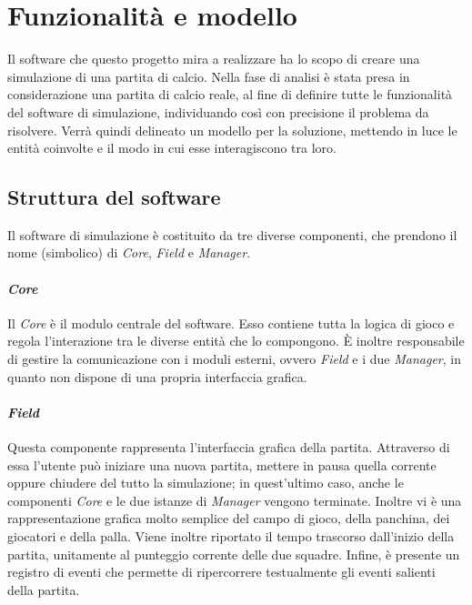 
\section{Funzionalità e modello}
\label{sec:analisi}

Il software che questo progetto mira a realizzare ha lo scopo di creare una simulazione di una partita di calcio. Nella fase di analisi è stata presa in considerazione una partita di calcio reale, al fine di definire tutte le funzionalità del software di simulazione, individuando così con precisione il problema da risolvere. Verrà quindi delineato un modello per la soluzione, mettendo in luce le entità coinvolte e il modo in cui esse interagiscono tra loro.

\subsection{Struttura del software}
\label{sec:struttura_del_software}

Il software di simulazione è costituito da tre diverse componenti, che prendono il nome (simbolico) di \textit{Core}, \textit{Field} e \textit{Manager}.

\paragraph{\textit{Core}} \label{sec:struttura_core} Il \textit{Core} è il modulo centrale del software. Esso contiene tutta la logica di gioco e regola l'interazione tra le diverse entità che lo compongono. È inoltre responsabile di gestire la comunicazione con i moduli esterni, ovvero \textit{Field} e i due \textit{Manager}, in quanto non dispone di una propria interfaccia grafica.

\paragraph{\textit{Field}} \label{sec:struttura_field} Questa componente rappresenta l'interfaccia grafica della partita. Attraverso di essa l'utente può iniziare una nuova partita, mettere in pausa quella corrente oppure chiudere del tutto la simulazione; in quest'ultimo caso, anche le componenti \textit{Core} e le due istanze di \textit{Manager} vengono terminate. Inoltre vi è una rappresentazione grafica molto semplice del campo di gioco, della panchina, dei giocatori e della palla. Viene inoltre riportato il tempo trascorso dall'inizio della partita, unitamente al punteggio corrente delle due squadre. Infine, è presente un registro di eventi che permette di ripercorrere testualmente gli eventi salienti della partita.

